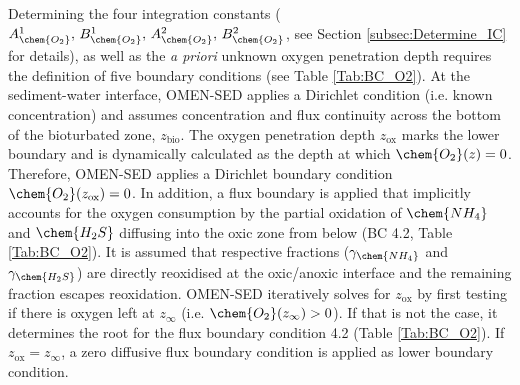 \documentclass[gmd, manuscript]{copernicus}
\begin{document}
Determining the four integration constants ($A_{\chem{O_2}}^1,\, B_{\chem{O_2}}^1,\, A_{\chem{O_2}}^2,\, B_{\chem{O_2}}^2$, see Section \ref{subsec:Determine_IC} for details), as well as the \textit{a priori} unknown oxygen penetration 
depth requires the definition of five boundary conditions (see Table \ref{Tab:BC_O2}). 
At the sediment-water interface, OMEN-SED applies a Dirichlet condition (i.e. known concentration) and assumes concentration and flux continuity across the bottom of the bioturbated zone, $z_{\mathrm{bio}}$. 
The oxygen penetration depth $z_{\mathrm{ox}}$ marks the lower boundary and is dynamically calculated as the depth at which $\chem{O_2}(z)=0$. 
Therefore, OMEN-SED applies a Dirichlet boundary condition $\chem{O_2}(z_{\mathrm{ox}})=0$. In addition, a flux boundary is applied that implicitly accounts for the oxygen consumption by the partial oxidation 
of $\chem{NH_4}$ and $\chem{H_2S}$ diffusing into the oxic zone from below (BC 4.2, Table \ref{Tab:BC_O2}). It is assumed that respective fractions ($\gamma_{\chem{NH_4}}$ and $\gamma_{\chem{H_2S}}$) are directly reoxidised 
at the oxic/anoxic interface and the remaining fraction escapes reoxidation. OMEN-SED iteratively solves for $z_{\mathrm{ox}}$ by first testing if there is oxygen left at $z_\infty$ (i.e. $\chem{O_2}(z_\infty) > 0$). If that is not the case, it determines the root for the flux 
boundary condition 4.2 (Table \ref{Tab:BC_O2}). If $z_{\mathrm{ox}}=z_\infty$,  a zero diffusive flux boundary condition is applied as lower boundary condition. 
\end{document}
